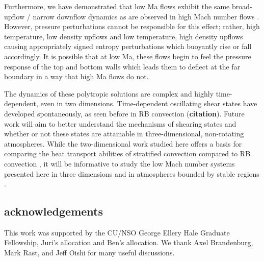 \documentclass[aps, prl, twocolumn, groupedaddress, amsfonts, amssymb, amsmath]{revtex4-1}
\begin{document}
Furthermore, we have demonstrated that low Ma flows exhibit the same broad-upflow / narrow downflow dynamics
as are observed in high Mach number flows \cite{hurlburt&all1984}.  However, pressure perturbations
cannot be responsible for this effect; rather, high temperature, low density upflows and low temperature,
high density upflows causing appropriately signed entropy perturbations which buoyantly rise or fall accordingly.
It is possible that at low Ma, these flows begin to feel the pressure response of the
top and bottom walls which leads them to deflect at the far boundary in a way that high Ma flows do not.

The dynamics of these polytropic solutions are complex and highly time-dependent, even in two dimensions.
Time-dependent oscillating shear states have developed spontaneously, as seen before in RB convection
(\textbf{citation}).  Future work will aim to better understand the mechanisms of shearing states and
whether or not these states are attainable in three-dimensional, non-rotating atmospheres.  While the
two-dimensional work studied here offers a basis for comparing the heat transport abilities of stratified
convection compared to RB convection \cite{johnston&doering2009}, it will be informative to study the low 
Mach number systems presented here in three dimensions and in atmospheres bounded by stable regions
\cite{hurlburt&all1986}.


\subsection{acknowledgements}
This work was supported by the CU/NSO George Ellery Hale Graduate Fellowship,
Juri's allocation and Ben's allocation.
We thank Axel Brandenburg, Mark Rast, and Jeff Oishi for many useful discussions.


\end{document}
